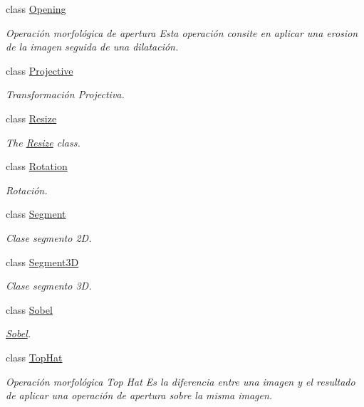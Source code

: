 \begin{DoxyCompactItemize}
class \hyperlink{class_i3_d_1_1_opening}{Opening}
\begin{DoxyCompactList}\small\item\em Operación morfológica de apertura Esta operación consite en aplicar una erosion de la imagen seguida de una dilatación. \end{DoxyCompactList}\item 
class \hyperlink{class_i3_d_1_1_projective}{Projective}
\begin{DoxyCompactList}\small\item\em Transformación Projectiva. \end{DoxyCompactList}\item 
class \hyperlink{class_i3_d_1_1_resize}{Resize}
\begin{DoxyCompactList}\small\item\em The \hyperlink{class_i3_d_1_1_resize}{Resize} class. \end{DoxyCompactList}\item 
class \hyperlink{class_i3_d_1_1_rotation}{Rotation}
\begin{DoxyCompactList}\small\item\em Rotación. \end{DoxyCompactList}\item 
class \hyperlink{class_i3_d_1_1_segment}{Segment}
\begin{DoxyCompactList}\small\item\em Clase segmento 2D. \end{DoxyCompactList}\item 
class \hyperlink{class_i3_d_1_1_segment3_d}{Segment3D}
\begin{DoxyCompactList}\small\item\em Clase segmento 3D. \end{DoxyCompactList}\item 
class \hyperlink{class_i3_d_1_1_sobel}{Sobel}
\begin{DoxyCompactList}\small\item\em \hyperlink{class_i3_d_1_1_sobel}{Sobel}. \end{DoxyCompactList}\item 
class \hyperlink{class_i3_d_1_1_top_hat}{Top\+Hat}
\begin{DoxyCompactList}\small\item\em Operación morfológica Top Hat Es la diferencia entre una imagen y el resultado de aplicar una operación de apertura sobre la misma imagen. \end{DoxyCompactList}\item 

\end{DoxyCompactItemize}
